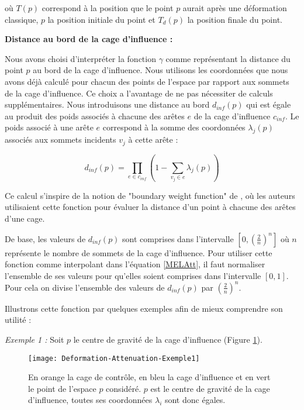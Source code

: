 où $T(p)$ correspond à la position que le point $p$ aurait après une déformation
classique, $p$ la position initiale du point et $T_{d}(p)$ la position finale
du point.

\textbf{Distance au bord de la cage d'influence :}

Nous avons choisi d'interpréter la fonction $\gamma$ comme représentant la
distance du point $p$ au bord de la cage d'influence. Nous utilisons les
coordonnées que nous avons déjà calculé pour chacun des points de l'espace par
rapport aux sommets de la cage d'influence. Ce choix a l'avantage de ne pas
nécessiter de calculs supplémentaires. Nous introduisons une distance au bord
$d_{inf}(p)$ qui est égale au produit des poids associés à chacune des arêtes
$e$ de la cage d'influence $c_{inf}$. Le poids associé à une arête $e$
correspond à la somme des coordonnées $\lambda_j(p)$ associés aux sommets
incidents $v_j$ à cette arête :

\begin{equation}
  d_{inf}(p) = \prod_{e \in c_{inf}} (1 - \sum_{v_j \in e} \lambda_j(p))
  \label{MELInf}
\end{equation}

Ce calcul s'inspire de la notion de "boundary weight function" de
\cite{GPCP13}, où les auteurs utilisaient cette fonction pour évaluer la
distance d'un point à chacune des arêtes d'une cage.

De base, les valeurs de $d_{inf}(p)$ sont comprises dans l'intervalle
$[0,(\frac{2}{n})^n]$ où $n$ représente le nombre de sommets de la cage
d'influence. Pour utiliser cette fonction comme interpolant dans l'équation
\ref{MELAtt}, il faut normaliser l'ensemble de ses valeurs pour qu'elles
soient comprises dans l'intervalle $[0,1]$. Pour cela on divise l'ensemble des
valeurs de $d_{inf}(p)$ par $(\frac{2}{n})^n$.

Illustrons cette fonction par quelques exemples afin de mieux comprendre son
utilité :

\textit{Exemple 1 :} Soit $p$ le centre de gravité de la cage d'influence
(Figure \ref{MELEx1}).

\begin{figure}[ht]
\begin{center}
\texttt{[image: Deformation-Attenuation-Exemple1]}

\caption[Atténuation : Exemple 1] {En orange la cage de contrôle, en bleu la
cage d'influence et en vert le point de l'espace $p$ considéré. $p$ est le
centre de gravité de la cage d'influence, toutes ses coordonnées $\lambda_i$
sont donc égales.}

\label{MELEx1}
\end{center}
\end{figure}

